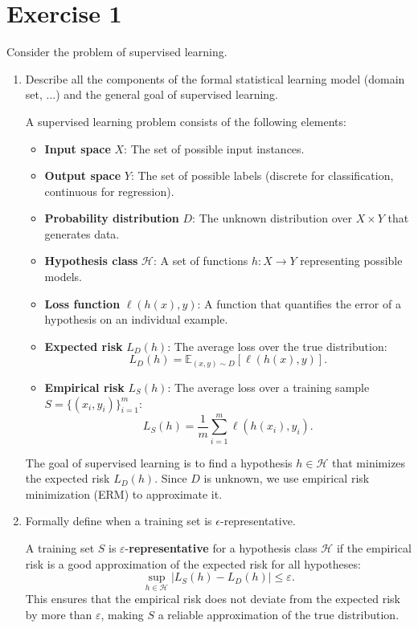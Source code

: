 \documentclass[a4paper,11pt,oneside]{book}
\begin{document}
\section{Exercise 1}
    Consider the problem of supervised learning.
    \begin{enumerate}
        \item Describe all the components of the formal statistical learning model (domain set, ...) and the general goal of supervised learning.
            \begin{solution}
                A supervised learning problem consists of the following elements:
                \begin{itemize}
                    \item \textbf{Input space} $X$: The set of possible input instances.
                    \item \textbf{Output space} $Y$: The set of possible labels (discrete for classification, continuous for regression).
                    \item \textbf{Probability distribution} $D$: The unknown distribution over $X \times Y$ that generates data.
                    \item \textbf{Hypothesis class} $\mathcal{H}$: A set of functions $h : X \to Y$ representing possible models.
                    \item \textbf{Loss function} $\ell(h(x), y)$: A function that quantifies the error of a hypothesis on an individual example.
                    \item \textbf{Expected risk} $L_D(h)$: The average loss over the true distribution:
                    \[
                    L_D(h) = \mathbb{E}_{(x,y) \sim D} [\ell(h(x), y)].
                    \]
                    \item \textbf{Empirical risk} $L_S(h)$: The average loss over a training sample $S = \{(x_i, y_i)\}_{i=1}^{m}$:
                    \[
                    L_S(h) = \frac{1}{m} \sum_{i=1}^{m} \ell(h(x_i), y_i).
                    \]
                \end{itemize}
                The goal of supervised learning is to find a hypothesis $h \in \mathcal{H}$ that minimizes the expected risk $L_D(h)$. Since $D$ is unknown, we use empirical risk minimization (ERM) to approximate it.
            \end{solution}
        
        \clearpage
        \item Formally define when a training set is $\epsilon$-representative.
            \begin{solution}
                A training set $S$ is $\varepsilon$-\textbf{representative} for a hypothesis class $\mathcal{H}$ if the empirical risk is a good approximation of the expected risk for all hypotheses:
                \[
                \sup_{h \in \mathcal{H}} |L_S(h) - L_D(h)| \leq \varepsilon.
                \]
                This ensures that the empirical risk does not deviate from the expected risk by more than $\varepsilon$, making $S$ a reliable approximation of the true distribution.
            \end{solution}
            

\end{enumerate}
\end{document}
